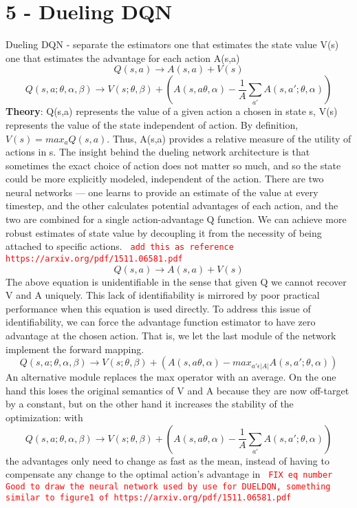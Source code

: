 \documentclass[12pt]{article}
\begin{document}
\section*{5 - Dueling DQN }
Dueling DQN - separate the estimators
one that estimates the state value V(s)
one that estimates the advantage for each action A(s,a)
\begin{equation}
Q(s,a) \rightarrow A(s,a) + V(s)
\end{equation}
\begin{equation}
Q(s,a; \theta, \alpha, \beta) \rightarrow V(s; \theta, \beta) + (A(s,a\theta, \alpha) - \frac{1}{A} \sum_{a'}^{} A(s,a';\theta,\alpha ))
\end{equation}
\textbf{Theory}:
Q(s,a) represents the value of a given action a chosen in state s, V(s) represents the value of the state independent of action. By definition, $V(s)=max_{a}Q(s,a)$. Thus, A(s,a) provides a relative measure of the utility of actions in s. The insight behind the dueling network architecture is that sometimes the exact choice of action does not matter so much, and so the state could be more explicitly modeled, independent of the action. There are two neural networks — one learns to provide an estimate of the value at every timestep, and the other calculates potential advantages of each action, and the two are combined for a single action-advantage Q function. We can achieve more robust estimates of state value by decoupling it from the necessity of being attached to specific actions.
 \textcolor{red}{\texttt{ add this as reference https://arxiv.org/pdf/1511.06581.pdf }}
\newline
\begin{equation}
Q(s,a) \rightarrow A(s,a) + V(s)
\end{equation}
The above equation is unidentifiable in the sense that given Q
we cannot recover V and A uniquely. This lack of identifiability is mirrored by
poor practical performance when this equation is used directly. To address this issue of identifiability, we can force the advantage
function estimator to have zero advantage at the
chosen action. That is, we let the last module of the network
implement the forward mapping.
\begin{equation}
Q(s,a; \theta, \alpha, \beta) \rightarrow V(s; \theta, \beta) + (A(s,a\theta, \alpha) - max_{a' \epsilon |A|} A(s,a';\theta,\alpha ))
\end{equation}
An alternative module replaces the max operator with an
average. On the one hand this loses the original semantics of V and
A because they are now off-target by a constant, but on
the other hand it increases the stability of the optimization:
with 
\begin{equation}
Q(s,a; \theta, \alpha, \beta) \rightarrow V(s; \theta, \beta) + (A(s,a\theta, \alpha) - \frac{1}{A} \sum_{a'}^{} A(s,a';\theta,\alpha ))
\end{equation}
 the advantages only need to change as fast as the
mean, instead of having to compensate any change to the
optimal action’s advantage in  \textcolor{red}{\texttt{ FIX eq number }}
\newline
 \textcolor{red}{\texttt{ Good to draw the neural network used by use for DUELDQN, something similar to figure1 of https://arxiv.org/pdf/1511.06581.pdf }}
\end{document}
